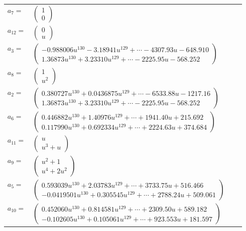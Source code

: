 \documentclass[1p]{elsarticle_modified}
\theoremstyle{definition}
\begin{document}
\begin{tabular}{m{7pt} m{180pt} m{7pt} m{180pt} }
\flushright $a_{7}=$&$\begin{pmatrix}1\\0\end{pmatrix}$ \\
\flushright $a_{12}=$&$\begin{pmatrix}0\\u\end{pmatrix}$ \\
\flushright $a_{3}=$&$\begin{pmatrix}-0.988006 u^{130}-3.18941 u^{129}+\cdots-4307.93 u-648.910\\1.36873 u^{130}+3.23310 u^{129}+\cdots-2225.95 u-568.252\end{pmatrix}$ \\
\flushright $a_{8}=$&$\begin{pmatrix}1\\u^2\end{pmatrix}$ \\
\flushright $a_{2}=$&$\begin{pmatrix}0.380727 u^{130}+0.0436875 u^{129}+\cdots-6533.88 u-1217.16\\1.36873 u^{130}+3.23310 u^{129}+\cdots-2225.95 u-568.252\end{pmatrix}$ \\
\flushright $a_{6}=$&$\begin{pmatrix}0.446882 u^{130}+1.40976 u^{129}+\cdots+1941.40 u+215.692\\0.117990 u^{130}+0.692334 u^{129}+\cdots+2224.63 u+374.684\end{pmatrix}$ \\
\flushright $a_{11}=$&$\begin{pmatrix}u\\u^3+u\end{pmatrix}$ \\
\flushright $a_{9}=$&$\begin{pmatrix}u^2+1\\u^4+2 u^2\end{pmatrix}$ \\
\flushright $a_{5}=$&$\begin{pmatrix}0.593039 u^{130}+2.03783 u^{129}+\cdots+3733.75 u+516.466\\-0.0419501 u^{130}+0.305545 u^{129}+\cdots+2788.24 u+509.061\end{pmatrix}$ \\
\flushright $a_{10}=$&$\begin{pmatrix}0.452060 u^{130}+0.814581 u^{129}+\cdots+2309.50 u+589.182\\-0.102605 u^{130}+0.105061 u^{129}+\cdots+923.553 u+181.597\end{pmatrix}$ \\

\end{tabular}
\end{document}
